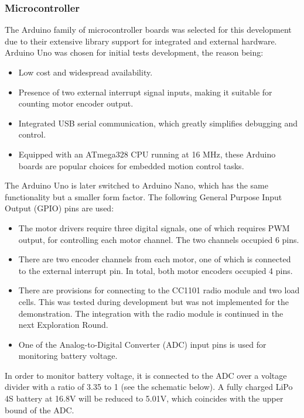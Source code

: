 \subsubsection{Microcontroller}
\label{subsubsection:exploration_1_microcontroller}

The Arduino family of microcontroller boards was selected for this development due to their extensive library support for integrated and external hardware. 
Arduino Uno was chosen for initial tests development, the reason being:
\begin{itemize}
    \item Low cost and widespread availability.
    \item Presence of two external interrupt signal inputs, making it suitable for counting motor encoder output. 
    \item Integrated USB serial communication, which greatly simplifies debugging and control.
    \item Equipped with an ATmega328 CPU running at 16 MHz, these Arduino boards are popular choices for embedded motion control tasks.
\end{itemize}

The Arduino Uno is later switched to Arduino Nano, which has the same functionality but a smaller form factor. The following General Purpose Input Output (GPIO) pins are used:
\begin{itemize}
    \item The motor drivers require three digital signals, one of which requires PWM output, for controlling each motor channel. The two channels occupied 6 pins. 
    \item There are two encoder channels from each motor, one of which is connected to the external interrupt pin. In total, both motor encoders occupied 4 pins.
    \item There are provisions for connecting to the CC1101 radio module and two load cells. This was tested during development but was not implemented for the demonstration. The integration with the radio module is continued in the next Exploration Round.
    \item One of the Analog-to-Digital Converter (ADC) input pins is used for monitoring battery voltage.
\end{itemize}

In order to monitor battery voltage, it is connected to the ADC over a voltage divider with a ratio of 3.35 to 1 (see the schematic below). A fully charged LiPo 4S battery at 16.8V will be reduced to 5.01V, which coincides with the upper bound of the ADC. 

